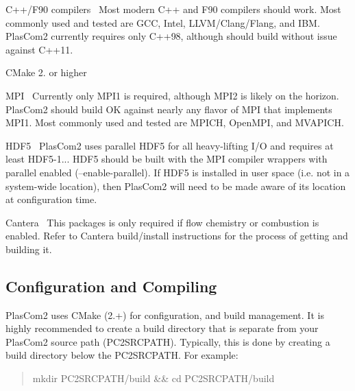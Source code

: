 \begin{DoxyItemize}
\item C++/\+F90 compilers~\newline
 Most modern C++ and F90 compilers should work. Most commonly used and tested are G\+CC, Intel, L\+L\+V\+M/\+Clang/\+Flang, and I\+BM. Plas\+Com2 currently requires only C++98, although should build without issue against C++11.
\item C\+Make 2. or higher
\item M\+PI~\newline
 Currently only M\+P\+I1 is required, although M\+P\+I2 is likely on the horizon. Plas\+Com2 should build OK against nearly any flavor of M\+PI that implements M\+P\+I1. Most commonly used and tested are M\+P\+I\+CH, Open\+M\+PI, and M\+V\+A\+P\+I\+CH.
\item H\+D\+F5~\newline
 Plas\+Com2 uses parallel H\+D\+F5 for all heavy-\/lifting I/O and requires at least H\+D\+F5-\/1... H\+D\+F5 should be built with the M\+PI compiler wrappers with parallel enabled (--enable-\/parallel). If H\+D\+F5 is installed in user space (i.\+e. not in a system-\/wide location), then Plas\+Com2 will need to be made aware of its location at configuration time.
\item Cantera~\newline
 This packages is only required if flow chemistry or combustion is enabled. Refer to Cantera build/install instructions for the process of getting and building it.
\end{DoxyItemize}\hypertarget{getting_started_configbuild}{}\subsection{Configuration and Compiling}\label{getting_started_configbuild}
Plas\+Com2 uses C\+Make (2.+) for configuration, and build management. It is highly recommended to create a build directory that is separate from your Plas\+Com2 source path (P\+C2\+S\+R\+C\+P\+A\+TH). Typically, this is done by creating a build directory below the P\+C2\+S\+R\+C\+P\+A\+TH. For example\+:~\newline
 \begin{quote}
mkdir P\+C2\+S\+R\+C\+P\+A\+T\+H/build \&\& cd P\+C2\+S\+R\+C\+P\+A\+T\+H/build~\newline
\end{quote}



